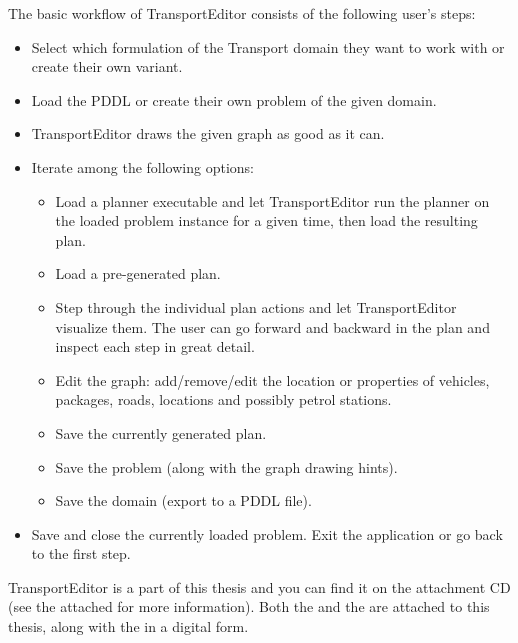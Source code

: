 The basic workflow of TransportEditor consists of the following user's steps:
\begin{itemize}
\item Select which formulation of the Transport domain they want to work with or create their own variant.
\item Load the PDDL or create their own problem of the given domain.
\item TransportEditor draws the given graph as good as it can.
\item Iterate among the following options:
\begin{itemize}
\item Load a planner executable and let TransportEditor run the planner on the loaded problem instance for a given time, then load the resulting plan.
\item Load a pre-generated plan.
\item Step through the individual plan actions and let TransportEditor visualize them.
The user can go forward and backward in the plan and inspect each step in great detail.
\item Edit the graph: add/remove/edit the location or properties of vehicles, packages, roads, locations and possibly petrol stations.
\item Save the currently generated plan.
\item Save the problem (along with the graph drawing hints).
\item Save the domain (export to a PDDL file).
\end{itemize}
\item Save and close the currently loaded problem. Exit the application or go back to the first step.
\end{itemize}

TransportEditor is a part of this thesis and you can find it on the attachment CD (see the attached  for more information). Both the  and
the  are attached to this thesis, along with the  in a digital form.

